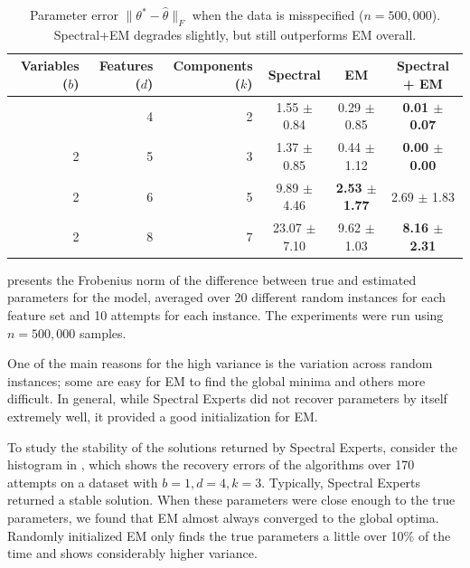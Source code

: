 \begin{table}[tbhp]
\caption{Parameter error $\|\theta^* - \hat \theta\|_F$ when the data is misspecified ($n = 500,000$).
Spectral+EM degrades slightly, but still outperforms EM overall.
}
\label{tbl:parameter-recovery-mis}
\vskip 0.15in
\begin{center}
\begin{small}
\begin{sc}

  \begin{tabular}{ r r r c c c }
\hline
\abovespace\belowspace
Variables ($b$) & Features ($d$) & Components ($k$) & Spectral & EM & Spectral + EM \\
\hline
\abovespace
 1 & 4 & 2 &  1.55 $\pm$ 0.84 & 0.29 $\pm$ 0.85 &  {\bf 0.01 $\pm$ 0.07} \\
 2 & 5 & 3 &  1.37 $\pm$ 0.85 & 0.44 $\pm$ 1.12 &  {\bf 0.00 $\pm$ 0.00} \\
 2 & 6 & 5 &  9.89 $\pm$ 4.46 & {\bf 2.53 $\pm$ 1.77} &  2.69 $\pm$ 1.83 \\
 2 & 8 & 7 & 23.07 $\pm$ 7.10 & 9.62 $\pm$ 1.03 &  {\bf 8.16 $\pm$ 2.31}  \\
\hline

\end{tabular}
\end{sc}
\end{small}
\end{center}
\vskip -0.1in
\end{table}


 presents the Frobenius norm of the
difference between true and estimated parameters for the model, averaged
over 20 different random instances for each feature set and 10 attempts
for each instance. The experiments were run using $n = 500,000$ samples.

One of the main reasons for the high variance is the variation across
random instances; some are easy for EM to find the global minima and
others more difficult. In general, while Spectral Experts did not
recover parameters by itself extremely well, it provided a good initialization for
EM.

To study the stability of the solutions returned by Spectral Experts,
consider the histogram in , which shows the recovery
errors of the algorithms over 170 attempts on a dataset with $b = 1, d = 4,
k = 3$. Typically, Spectral Experts returned a stable solution.
When these parameters were close enough to the true parameters, we found
that EM almost always converged to the global optima. Randomly
initialized EM only finds the true parameters a little over 10\% of the
time and shows considerably higher variance. 

